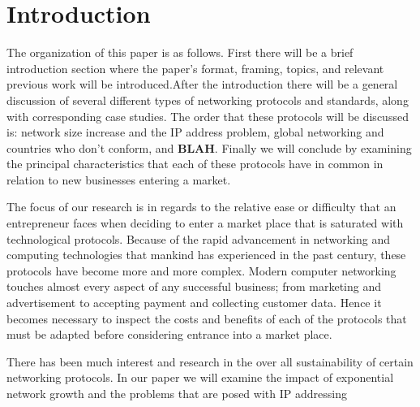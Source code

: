 \section{Introduction}

%
%


The organization of this paper is as follows. First there will be a brief 
introduction section where the paper's format, framing, topics, and relevant previous work will
be introduced.After the introduction there will be a general discussion of several different
types of networking protocols and standards, along with corresponding case 
studies. The order that these protocols will be discussed is: network size
increase and the IP address problem, global networking and countries who don't
conform, and \textbf{BLAH}. Finally we will conclude by examining the 
principal characteristics that each of these protocols have in common in 
relation to new businesses entering a market.


The focus of our research is in regards to the relative ease or difficulty 
that an entrepreneur faces when deciding to enter a market place that is 
saturated with technological protocols. Because of the rapid advancement in 
networking and computing technologies that mankind has experienced in the past
century, these protocols have become more and more complex. Modern computer 
networking touches almost every aspect of any successful business; from 
marketing and advertisement to accepting payment and collecting customer data.
Hence it becomes necessary to inspect the costs and benefits of each of the 
protocols that must be adapted before considering entrance into a market place. 


There has been much interest and research in the over all sustainability of 
certain networking protocols\cite{4124025}. In our paper we will examine the impact of
exponential network growth and the problems that are posed with IP addressing   